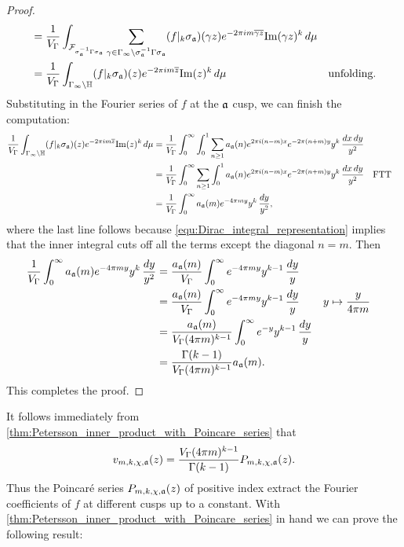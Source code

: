 \begin{proof}
\begin{align*}
        &= \frac{1}{V_{\Gamma}}\int_{\mathcal{F}_{\sigma_{\mathfrak{a}}^{-1}\Gamma\sigma_{\mathfrak{a}}}}\sum_{\gamma \in \Gamma_{\infty}\backslash\sigma_{\mathfrak{a}}^{-1}\Gamma\sigma_{\mathfrak{a}}}(f|_{k}\sigma_{\mathfrak{a}})(\gamma z)e^{-2\pi im\overline{\gamma z}}\mathrm{Im}(\gamma z)^{k}\,d\mu && \\
        &= \frac{1}{V_{\Gamma}}\int_{\Gamma_{\infty}\backslash\mathbb{H}}(f|_{k}\sigma_{\mathfrak{a}})(z)e^{-2\pi im\overline{z}}\mathrm{Im}(z)^{k}\,d\mu && \text{unfolding.}
      \end{align*}
      Substituting in the Fourier series of $f$ at the $\mathfrak{a}$ cusp, we can finish the computation:
      \begin{align*}
        \frac{1}{V_{\Gamma}}\int_{\Gamma_{\infty}\backslash\mathbb{H}}(f|_{k}\sigma_{\mathfrak{a}})(z)e^{-2\pi im\overline{z}}\mathrm{Im}(z)^{k}\,d\mu &= \frac{1}{V_{\Gamma}}\int_{0}^{\infty}\int_{0}^{1}\sum_{n \ge 1}a_{\mathfrak{a}}(n)e^{2\pi i(n-m)x}e^{-2\pi(n+m)y}y^{k}\,\frac{dx\,dy}{y^{2}} \\
        &= \frac{1}{V_{\Gamma}}\int_{0}^{\infty}\sum_{n \ge 1}\int_{0}^{1}a_{\mathfrak{a}}(n)e^{2\pi i(n-m)x}e^{-2\pi(n+m)y}y^{k}\,\frac{dx\,dy}{y^{2}} && \text{FTT} \\
        &= \frac{1}{V_{\Gamma}}\int_{0}^{\infty}a_{\mathfrak{a}}(m)e^{-4\pi my}y^{k}\,\frac{dy}{y^{2}},
      \end{align*}
      where the last line follows because \cref{equ:Dirac_integral_representation} implies that the inner integral cuts off all the terms except the diagonal $n = m$. Then
      \begin{align*}
        \frac{1}{V_{\Gamma}}\int_{0}^{\infty}a_{\mathfrak{a}}(m)e^{-4\pi my}y^{k}\,\frac{dy}{y^{2}} &= \frac{a_{\mathfrak{a}}(m)}{V_{\Gamma}}\int_{0}^{\infty}e^{-4\pi my}y^{k-1}\,\frac{dy}{y} \\
        &= \frac{a_{\mathfrak{a}}(m)}{V_{\Gamma}}\int_{0}^{\infty}e^{-4\pi my}y^{k-1}\,\frac{dy}{y} && \text{$y \mapsto \frac{y}{4\pi m}$} \\
        &= \frac{a_{\mathfrak{a}}(m)}{V_{\Gamma}(4\pi m)^{k-1}}\int_{0}^{\infty}e^{-y}y^{k-1}\,\frac{dy}{y} \\
        &= \frac{\Gamma(k-1)}{V_{\Gamma}(4\pi m)^{k-1}}a_{\mathfrak{a}}(m).
      \end{align*}
      This completes the proof.
    \end{proof}

    It follows immediately from \cref{thm:Petersson_inner_product_with_Poincare_series} that
    \[
      v_{m,k,\chi,\mathfrak{a}}(z) = \frac{V_{\Gamma}(4\pi m)^{k-1}}{\Gamma(k-1)}P_{m,k,\chi,\mathfrak{a}}(z).
    \]
    Thus the Poincar\'e series $P_{m,k,\chi,\mathfrak{a}}(z)$ of positive index extract the Fourier coefficients of $f$ at different cusps up to a constant. With \cref{thm:Petersson_inner_product_with_Poincare_series} in hand we can prove the following result:

